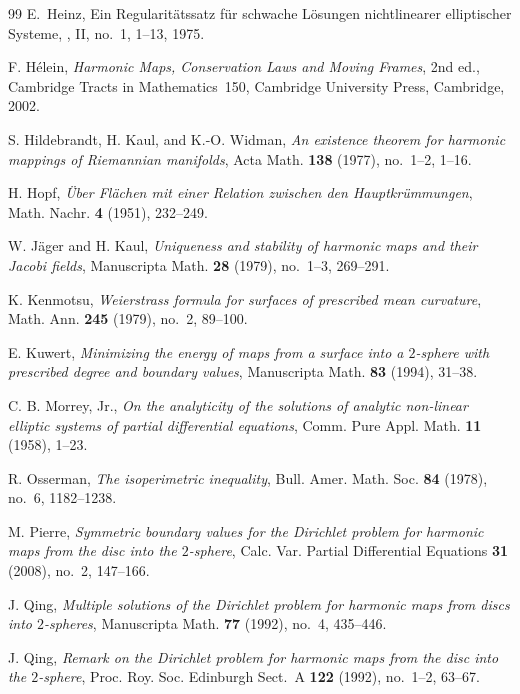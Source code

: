 \documentclass[11pt]{amsart}
\numberwithin{equation}{section}
\theoremstyle{remark}
\begin{document}
\begin{thebibliography}{99}
E.~Heinz,
\newblock Ein Regularit\"atssatz f\"ur schwache L\"osungen nichtlinearer elliptischer Systeme,
, II, no.~1, 1--13, 1975.


F. H\'elein,
\emph{Harmonic Maps, Conservation Laws and Moving Frames},
2nd ed., Cambridge Tracts in Mathematics~150, Cambridge University Press, Cambridge, 2002.

S. Hildebrandt, H. Kaul, and K.-O. Widman,
\emph{An existence theorem for harmonic mappings of Riemannian manifolds},
Acta Math. \textbf{138} (1977), no.~1--2, 1--16.

H. Hopf,
\emph{\"Uber Fl\"achen mit einer Relation zwischen den Hauptkr\"ummungen},
Math. Nachr. \textbf{4} (1951), 232--249.

W. J\"ager and H. Kaul,
\emph{Uniqueness and stability of harmonic maps and their Jacobi fields},
Manuscripta Math. \textbf{28} (1979), no.~1--3, 269--291.

K. Kenmotsu,
\emph{Weierstrass formula for surfaces of prescribed mean curvature},
Math. Ann. \textbf{245} (1979), no.~2, 89--100.

E. Kuwert,
\emph{Minimizing the energy of maps from a surface into a $2$-sphere with prescribed degree and boundary values},
Manuscripta Math. \textbf{83} (1994), 31--38.

C. B. Morrey, Jr.,
\emph{On the analyticity of the solutions of analytic non-linear elliptic systems of partial differential equations},
Comm. Pure Appl. Math. \textbf{11} (1958), 1--23.


R. Osserman,
\emph{The isoperimetric inequality},
Bull. Amer. Math. Soc. \textbf{84} (1978), no.~6, 1182--1238.

M. Pierre,
\emph{Symmetric boundary values for the Dirichlet problem for harmonic maps from the disc into the $2$-sphere},
Calc. Var. Partial Differential Equations \textbf{31} (2008), no.~2, 147--166.

J. Qing,
\emph{Multiple solutions of the Dirichlet problem for harmonic maps from discs into $2$-spheres},
Manuscripta Math. \textbf{77} (1992), no.~4, 435--446.

J. Qing,
\emph{Remark on the Dirichlet problem for harmonic maps from the disc into the $2$-sphere},
Proc. Roy. Soc. Edinburgh Sect.~A \textbf{122} (1992), no.~1--2, 63--67.


\end{thebibliography}
\end{document}
